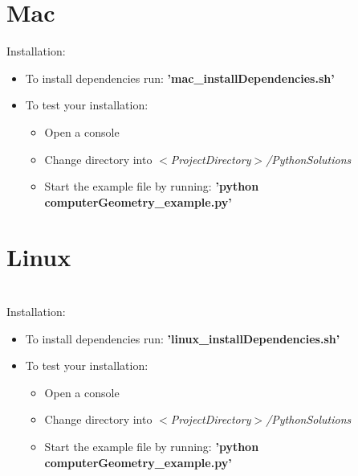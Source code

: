 \documentclass[]{article}
\begin{document}
\newpage
\section{Mac}\label{Mac}

Installation:
\begin{itemize}
	\item To install dependencies run: \textbf{'mac\_installDependencies.sh'}
	\item To test your installation:
	\begin{itemize}
		\item Open a console
		\item Change directory into \textit{$<$ProjectDirectory$>$/PythonSolutions}
		\item Start the example file by running: \textbf{'python computerGeometry\_example.py'}
	\end{itemize}
\end{itemize}

\newpage
\section{Linux}\label{Linux}

\mbox{}\\
Installation:
\begin{itemize}
	\item To install dependencies run: \textbf{'linux\_installDependencies.sh'}
	\item To test your installation:
	\begin{itemize}
		\item Open a console
		\item Change directory into \textit{$<$ProjectDirectory$>$/PythonSolutions}
		\item Start the example file by running: \textbf{'python computerGeometry\_example.py'}
	\end{itemize}
\end{itemize}
\end{document}
